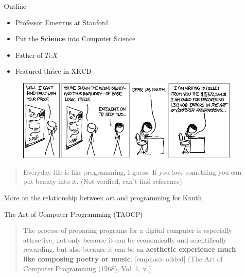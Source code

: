 \begin{frame}{Outline}
\begin{itemize}
\tightlist
\item
  Professor Emeritus at Stanford
\item
  Put the \textbf{Science} into Computer Science
\item
  Father of \(TeX\)
\item
  Featured thrice in XKCD
\end{itemize}

\begin{figure}
\centering
\includegraphics{./media/xkcd-applied_math.png}
\caption{}
\end{figure}

\begin{quote}
Everyday life is like programming, I guess. If you love something you
can put beauty into it. (Not verified, can't find reference)
\end{quote}

More on the relationship between art and programming for Knuth

\end{frame}

\begin{frame}{The Art of Computer Programming (TAOCP)}

\begin{quote}
The process of preparing programs for a digital computer is especially
attractive, not only because it can be economically and scientifically
rewarding, but also because it can be an \textbf{aesthetic experience
much like composing poetry or music}. {[}emphasis added{]} (The Art of
Computer Programming (1968), Vol. 1, v.)
\end{quote}

\end{frame}

